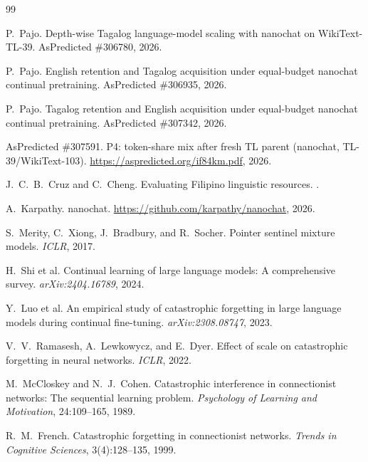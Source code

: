 \documentclass[11pt,a4paper]{article}
\begin{document}
\begin{thebibliography}{99}

P.~Pajo.
\newblock Depth-wise Tagalog language-model scaling with nanochat on WikiText-TL-39.
\newblock AsPredicted \#306780, 2026.

P.~Pajo.
\newblock English retention and Tagalog acquisition under equal-budget nanochat continual pretraining.
\newblock AsPredicted \#306935, 2026.

P.~Pajo.
\newblock Tagalog retention and English acquisition under equal-budget nanochat continual pretraining.
\newblock AsPredicted \#307342, 2026.

AsPredicted \#307591.
\newblock P4: token-share mix after fresh TL parent (nanochat, TL-39/WikiText-103).
\newblock \url{https://aspredicted.org/if84km.pdf}, 2026.

J.~C.~B.~Cruz and C.~Cheng.
\newblock Evaluating Filipino linguistic resources.
.

A.~Karpathy.
\newblock nanochat.
\newblock \url{https://github.com/karpathy/nanochat}, 2026.

S.~Merity, C.~Xiong, J.~Bradbury, and R.~Socher.
\newblock Pointer sentinel mixture models.
\newblock \emph{ICLR}, 2017.

H.~Shi et al.
\newblock Continual learning of large language models: A comprehensive survey.
\newblock \emph{arXiv:2404.16789}, 2024.

Y.~Luo et al.
\newblock An empirical study of catastrophic forgetting in large language models during continual fine-tuning.
\newblock \emph{arXiv:2308.08747}, 2023.

V.~V.~Ramasesh, A.~Lewkowycz, and E.~Dyer.
\newblock Effect of scale on catastrophic forgetting in neural networks.
\newblock \emph{ICLR}, 2022.

M.~McCloskey and N.~J.~Cohen.
\newblock Catastrophic interference in connectionist networks: The sequential learning problem.
\newblock \emph{Psychology of Learning and Motivation}, 24:109--165, 1989.

R.~M.~French.
\newblock Catastrophic forgetting in connectionist networks.
\newblock \emph{Trends in Cognitive Sciences}, 3(4):128--135, 1999.


\end{thebibliography}
\end{document}
